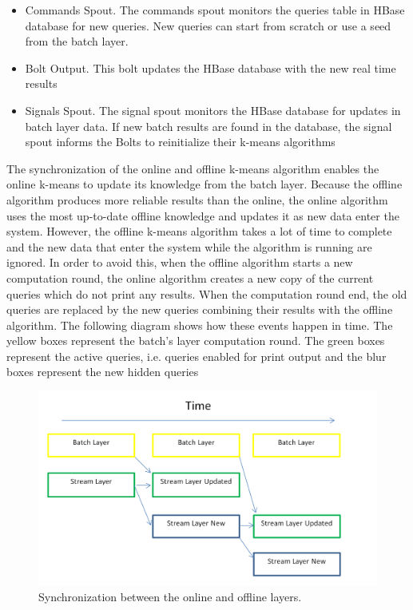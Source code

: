 \documentclass{lmproj}
\begin{document}
\begin{itemize}
	\item Commands Spout. The commands spout monitors the queries table in HBase database for new queries.  New queries can start from scratch or use a seed from the batch layer. 
	\item Bolt Output. This bolt updates the HBase database with the new real time results
	\item Signals Spout. The signal spout monitors the HBase database for updates in batch layer data. If new batch results are found in the database, the signal spout informs the Bolts to reinitialize their k-means algorithms 
\end{itemize}

The synchronization of the online and offline k-means algorithm enables the online k-means to update its knowledge from the batch layer. Because the offline algorithm produces more reliable results than the online, the online algorithm uses the most up-to-date offline knowledge and updates it as new data enter the system. However, the offline k-means algorithm takes a lot of time to complete and the new data that enter the system while the algorithm is running are ignored. In order to avoid this, when the offline algorithm starts a new computation round, the online algorithm creates a new copy of the current queries which do not print any results. When the computation round end, the old queries are replaced by the new queries combining their results with the offline algorithm. The following diagram shows how these events happen in time. The yellow boxes represent the batch’s layer computation round. The green boxes represent the active queries, i.e. queries enabled for print output and the blur boxes represent the new hidden queries 

\begin{figure}[H]
	\centering	
	\includegraphics[scale=0.4]{synchronization}
	\caption{Synchronization between the online and offline layers.}
\end{figure}
\end{document}
